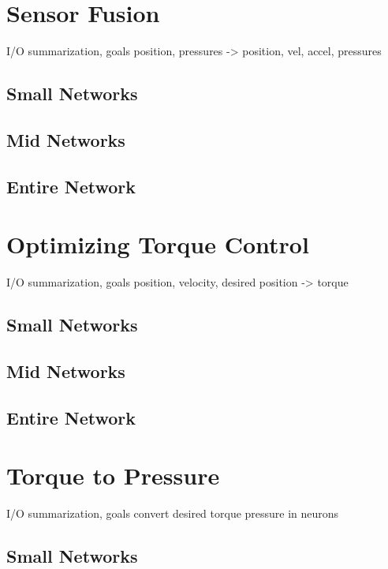\section{Sensor Fusion}

I/O summarization, goals
position, pressures -> position, vel, accel, pressures

\subsection{Small Networks}

\subsection{Mid Networks}

\subsection{Entire Network}

\section{Optimizing Torque Control}

I/O summarization, goals
position, velocity, desired position -> torque

\subsection{Small Networks}

\subsection{Mid Networks}

\subsection{Entire Network}

\section{Torque to Pressure}

I/O summarization, goals
convert desired torque pressure in neurons

\subsection{Small Networks}

